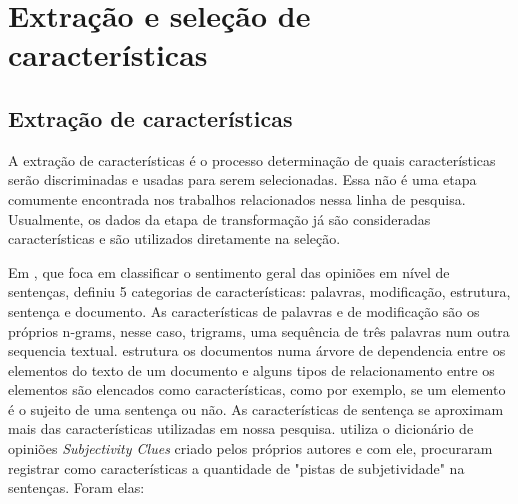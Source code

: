 \documentclass[template.tex]{subfiles}
\begin{document}

\section{Extração e seleção de características}

%
%
%
%
%

\subsection{Extração de características}

A extração de características é o processo determinação de quais características serão discriminadas e usadas para serem selecionadas. Essa não é uma etapa comumente encontrada nos trabalhos relacionados nessa linha de pesquisa. Usualmente, os dados da etapa de transformação já são consideradas características e são utilizados diretamente na seleção.

Em \cite{wilson2005recognizing}, que foca em classificar o sentimento geral das opiniões em nível de sentenças, definiu 5 categorias de características: palavras, modificação, estrutura, sentença e documento. As características de palavras e de modificação são os próprios n-grams, nesse caso, trigrams, uma sequência de três palavras num outra sequencia textual. \cite{wilson2005recognizing} estrutura os documentos numa árvore de dependencia entre os elementos do texto de um documento e alguns tipos de relacionamento entre os elementos são elencados como características, como por exemplo, se um elemento é o sujeito de uma sentença ou não. As características de sentença se aproximam mais das características utilizadas em nossa pesquisa. \cite{wilson2005recognizing} utiliza o dicionário de opiniões \textit{Subjectivity Clues} criado pelos próprios autores e com ele, procuraram registrar como características a quantidade de "pistas de subjetividade" na sentenças. Foram elas:
\end{document}
